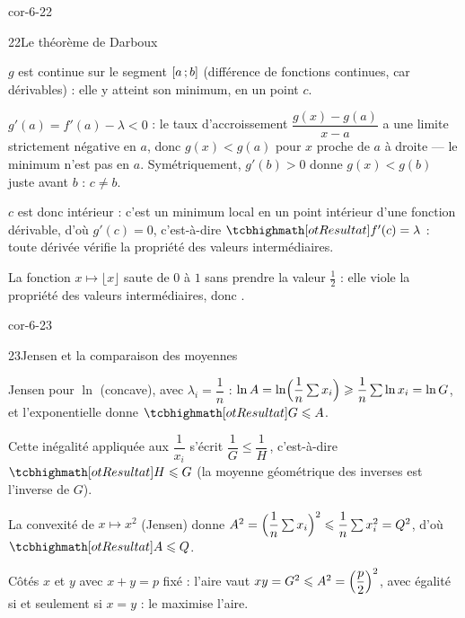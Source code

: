\begin{blocLivre}{cor-6-22}
\begin{corrige}{22}{Le théorème de Darboux}
\begin{questions}
  \item $g$ est continue sur le segment $\intFF{a}{b}$ (différence de
    fonctions continues, car dérivables) : elle y atteint son minimum, en
    un point $c$.
  \item $g'(a)=f'(a)-\lambda<0$ : le taux d'accroissement
    $\dfrac{g(x)-g(a)}{x-a}$ a une limite strictement négative en $a$, donc
    $g(x)<g(a)$ pour $x$ proche de $a$ à droite — le minimum n'est pas en
    $a$. Symétriquement, $g'(b)>0$ donne $g(x)<g(b)$ juste avant $b$ :
    $c\neq b$.
  \item $c$ est donc intérieur : c'est un minimum local en un point
    intérieur d'une fonction dérivable, d'où $g'(c)=0$, c'est-à-dire
    $\res{f'(c)=\lambda}$ : toute dérivée vérifie la propriété des valeurs
    intermédiaires.
  \item La fonction $x\mapsto\lfloor x\rfloor$ saute de $0$ à $1$ sans
    prendre la valeur $\frac12$ : elle viole la propriété des valeurs
    intermédiaires, donc .
\end{questions}
\end{corrige}
\end{blocLivre}

\begin{blocLivre}{cor-6-23}
\begin{corrige}{23}{Jensen et la comparaison des moyennes}
\begin{questions}
  \item Jensen pour $\ln$ (concave), avec $\lambda_i=\dfrac1n$ :
    $\ln A=\ln\Bigl(\dfrac{1}{n}\sum x_i\Bigr)\geq\dfrac1n\sum\ln x_i=\ln G$,
    et l'exponentielle donne $\res{G\leq A}$.
  \item Cette inégalité appliquée aux $\dfrac{1}{x_i}$ s'écrit
    $\dfrac1G\leq\dfrac{1}{H}$\,, c'est-à-dire $\res{H\leq G}$
    (la moyenne géométrique des inverses est l'inverse de $G$).
  \item La convexité de $x\mapsto x^{2}$ (Jensen) donne
    $A^{2}=\Bigl(\dfrac1n\sum x_i\Bigr)^{2}\leq\dfrac1n\sum x_i^{2}=Q^{2}$,
    d'où $\res{A\leq Q}$.
  \item Côtés $x$ et $y$ avec $x+y=p$ fixé : l'aire vaut
    $xy=G^{2}\leq A^{2}=\Bigl(\dfrac{p}{2}\Bigr)^{2}$, avec égalité si et
    seulement si $x=y$ : le  maximise l'aire.
\end{questions}
\end{corrige}
\end{blocLivre}


